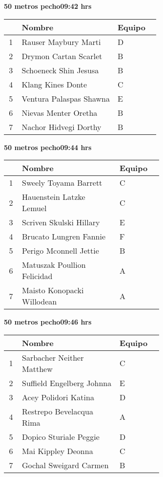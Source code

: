 \begin{minipage}{0.95\linewidth}
\begin{center}
\textbf{
50 metros pecho\hspace{1cm}09:42 hrs}
\end{center}
\begin{tabular}{cp{0.63\linewidth}l}
\hline
& \textbf{Nombre} & \textbf{Equipo} \\ \hline
1 & Rauser Maybury Marti & D \\ 
2 & Drymon Cartan Scarlet & B \\ 
3 & Schoeneck Shin Jesusa & B \\ 
4 & Klang Kines Donte & C \\ 
5 & Ventura Palaspas Shawna & E \\ 
6 & Nievas Menter Oretha & B \\ 
7 & Nachor Hidvegi Dorthy & B \\ 
\end{tabular}
\end{minipage}
\begin{minipage}{0.95\linewidth}
\begin{center}
\textbf{
50 metros pecho\hspace{1cm}09:44 hrs}
\end{center}
\begin{tabular}{cp{0.63\linewidth}l}
\hline
& \textbf{Nombre} & \textbf{Equipo} \\ \hline
1 & Sweely Toyama Barrett & C \\ 
2 & Hauenstein Latzke Lemuel & C \\ 
3 & Scriven Skulski Hillary & E \\ 
4 & Brucato Lungren Fannie & F \\ 
5 & Perigo Mconnell Jettie & B \\ 
6 & Matuszak Poullion Felicidad & A \\ 
7 & Maisto Konopacki Willodean & A \\ 
\end{tabular}
\end{minipage}
\begin{minipage}{0.95\linewidth}
\begin{center}
\textbf{
50 metros pecho\hspace{1cm}09:46 hrs}
\end{center}
\begin{tabular}{cp{0.63\linewidth}l}
\hline
& \textbf{Nombre} & \textbf{Equipo} \\ \hline
1 & Sarbacher Neither Matthew & C \\ 
2 & Suffield Engelberg Johnna & E \\ 
3 & Acey Polidori Katina & D \\ 
4 & Restrepo Bevelacqua Rima & A \\ 
5 & Dopico Sturiale Peggie & D \\ 
6 & Mai Kippley Deonna & C \\ 
7 & Gochal Sweigard Carmen & B \\ 
\end{tabular}
\end{minipage}
